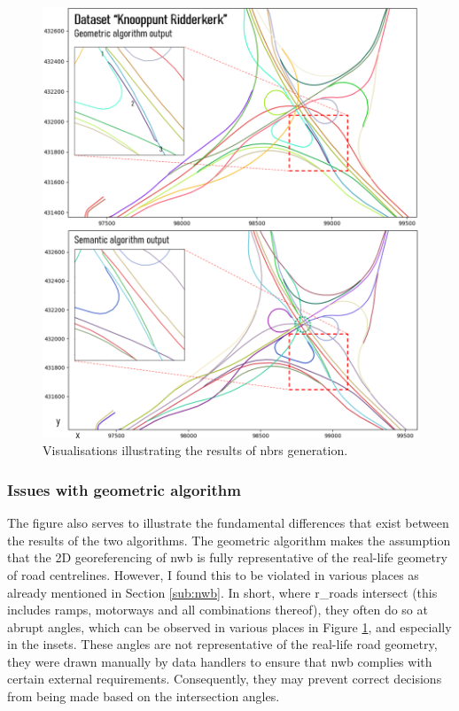 \begin{figure}
    \centering
    \includegraphics[width=\linewidth]{final_report/figs/nbrsgeneration0.png}
    \caption{Visualisations illustrating the results of \ac{nbrs} generation.}
    \label{fig:nbrsgeneration0}
\end{figure}

\subsubsection{Issues with geometric algorithm}

The figure also serves to illustrate the fundamental differences that exist between the results of the two algorithms. The geometric algorithm makes the assumption that the 2D georeferencing of \ac{nwb} is fully representative of the real-life geometry of road centrelines. However, I found this to be violated in various places as already mentioned in Section \ref{sub:nwb}. In short, where \ac{r_roads} intersect (this includes ramps, motorways and all combinations thereof), they often do so at abrupt angles, which can be observed in various places in Figure \ref{fig:nbrsgeneration0}, and especially in the insets. These angles are not representative of the real-life road geometry, they were drawn manually by data handlers to ensure that \ac{nwb} complies with certain external requirements. Consequently, they may prevent correct decisions from being made based on the intersection angles.

